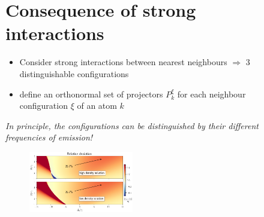 \documentclass[a0,plainsections]{sciposter}
\begin{document}
\begin{multicols}{2}
\begin{figure}
		\section{Consequence of strong interactions}
		\begin{itemize}
			\item Consider strong interactions between nearest neighbours $\Rightarrow$ 3 distinguishable configurations
			\item define an orthonormal set of projectors $P^\xi_k$ for each neighbour configuration $\xi$ of an atom $k$
		\end{itemize}
		\textit{\textcolor{rot}{In principle, the configurations can be distinguished by their different frequencies of emission!}}
		\begin{figure}
			\centering
			\includegraphics[width=0.5\textwidth]{./images/DemoPlot.png}
		\end{figure}
	\end{figure}

	\addtocounter{figure}{-2}
	\begin{figure}

\end{figure}
\end{multicols}
\end{document}
